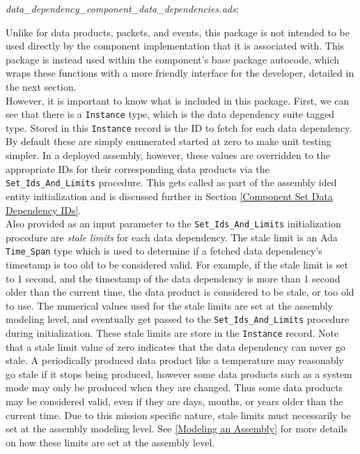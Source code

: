 \textit{data\_dependency\_component\_data\_dependencies.ads}:

Unlike for data products, packets, and events, this package is not intended to be used directly by the component implementation that it is associated with. This package is instead used within the component's base package autocode, which wraps these functions with a more friendly interface for the developer, detailed in the next section. \\

However, it is important to know what is included in this package. First, we can see that there is a \texttt{Instance} type, which is the data dependency suite tagged type. Stored in this \texttt{Instance} record is the ID to fetch for each data dependency. By default these are simply enumerated started at zero to make unit testing simpler. In a deployed assembly, however, these values are overridden to the appropriate IDs for their corresponding data products via the \texttt{Set\_Ids\_And\_Limits} procedure. This gets called as part of the assembly ided entity initialization and is discussed further in Section \ref{Component Set Data Dependency IDs}. \\

Also provided as an input parameter to the \texttt{Set\_Ids\_And\_Limits} initialization procedure are \textit{stale limits} for each data dependency. The stale limit is an Ada \texttt{Time\_Span} type which is used to determine if a fetched data dependency's timestamp is too old to be considered valid. For example, if the stale limit is set to 1 second, and the timestamp of the data dependency is more than 1 second older than the current time, the data product is considered to be stale, or too old to use. The numerical values used for the stale limits are set at the assembly modeling level, and eventually get passed to the \texttt{Set\_Ids\_And\_Limits} procedure during initialization. These stale limits are store in the \texttt{Instance} record. Note that a stale limit value of zero indicates that the data dependency can never go stale. A periodically produced data product like a temperature may reasonably go stale if it stops being produced, however some data products such as a system mode may only be produced when they are changed. Thus some data products may be considered valid, even if they are days, months, or years older than the current time. Due to this mission specific nature, stale limits must necessarily be set at the assembly modeling level. See \ref{Modeling an Assembly} for more details on how these limits are set at the assembly level. \\

